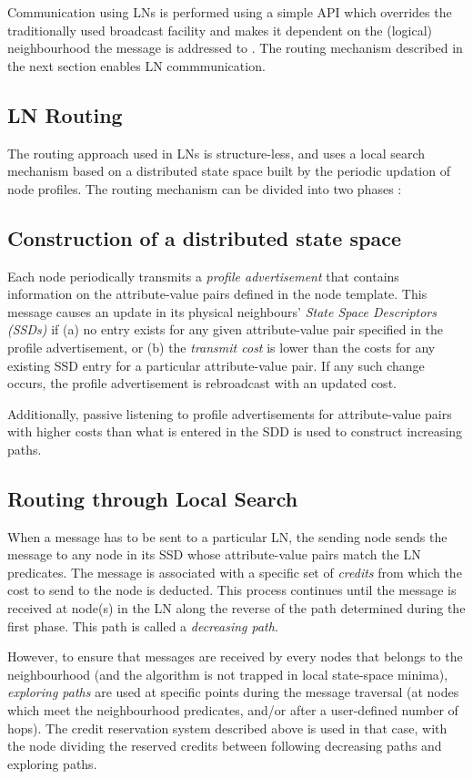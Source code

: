Communication using LNs is performed using a simple API which overrides the
traditionally used broadcast facility and makes it dependent on the (logical)
neighbourhood the message is addressed to \cite{mottola_LN:2006}. The routing mechanism described in
the next section enables LN commmunication.

\subsection{LN Routing}

The routing approach used in LNs is structure-less, and uses a local search
mechanism based on a distributed state space built by the periodic updation of
node profiles. The routing mechanism can be divided into two phases \cite{mottola_LNAbstraction}:

\subsection{Construction of a distributed state space}
Each node periodically transmits a \emph{profile advertisement} that contains
information on the attribute-value pairs defined in the node template. This message
causes an
update in its physical neighbours' \emph{State Space Descriptors (SSDs)} if (a)
no
entry exists for any given attribute-value pair specified in the profile
advertisement, or (b) the \emph{transmit cost} is lower than the costs for any
existing SSD entry for a particular attribute-value pair. If any such change
occurs, the profile advertisement is rebroadcast with an updated cost. 

Additionally, passive listening to profile advertisements for attribute-value
pairs with higher costs than what is entered in the SDD is used to construct
increasing paths.

\subsection{ Routing through Local Search}
When a message has to be sent to a particular LN, the sending node sends the
message to any node in its SSD whose attribute-value pairs match the LN
predicates. The message is associated with a specific set of \emph{credits} from
which the cost to send to the node is deducted. This process continues until the
message is received at node(s) in the LN along the reverse of the path
determined during the first phase. This path is called a \emph{decreasing path}.

However, to ensure that messages are received by every nodes that belongs to the
neighbourhood (and the algorithm is not trapped in local state-space minima),
\emph{exploring paths} are used at specific points during the message traversal
(at nodes which meet the neighbourhood predicates, and/or after a user-defined
number of hops). The credit reservation system described above is used in that
case, with the node dividing the reserved credits between following decreasing
paths and exploring paths.

